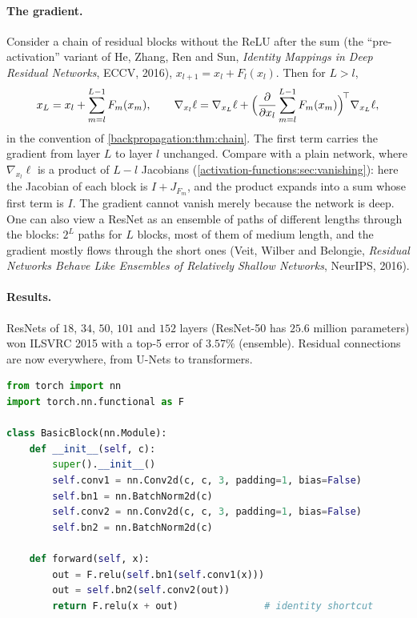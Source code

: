 \begin{notechapter}
\paragraph{The gradient.} Consider a chain of residual blocks without the ReLU after the sum
(the ``pre-activation'' variant of He, Zhang, Ren and Sun, \emph{Identity Mappings in Deep
Residual Networks}, ECCV, 2016), $x_{l+1} = x_l + F_l(x_l)$. Then for $L>l$,
\[
  x_L = x_l + \sum_{m=l}^{L-1}F_m(x_m),\qquad
  \nabla_{x_l}\ell = \nabla_{x_L}\ell + \Bigl(\frac{\partial}{\partial x_l}\sum_{m=l}^{L-1}F_m(x_m)\Bigr)^{\!\top}\nabla_{x_L}\ell,
\]
in the convention of \cref{backpropagation:thm:chain}. The first term carries the gradient
from layer $L$ to layer $l$ unchanged. Compare with a plain network, where $\nabla_{x_l}\ell$ is a product
of $L - l$ Jacobians (\cref{activation-functions:sec:vanishing}): here the Jacobian of each block
is $I + J_{F_m}$, and the product expands into a sum whose first term is $I$. The gradient cannot
vanish merely because the network is deep. One can also view a ResNet as an ensemble
of paths of different lengths through the blocks: $2^{L}$ paths for $L$ blocks, most of them of
medium length, and the gradient mostly flows through the short ones (Veit, Wilber and
Belongie, \emph{Residual Networks Behave Like Ensembles of Relatively Shallow Networks},
NeurIPS, 2016).

\paragraph{Results.} ResNets of $18$, $34$, $50$, $101$ and $152$ layers (ResNet-50 has $25.6$ million
parameters) won ILSVRC 2015 with a top-5 error of $3.57\%$ (ensemble). Residual
connections are now everywhere, from U-Nets to transformers.

\begin{lstlisting}[language=Python]
from torch import nn
import torch.nn.functional as F

class BasicBlock(nn.Module):
    def __init__(self, c):
        super().__init__()
        self.conv1 = nn.Conv2d(c, c, 3, padding=1, bias=False)
        self.bn1 = nn.BatchNorm2d(c)
        self.conv2 = nn.Conv2d(c, c, 3, padding=1, bias=False)
        self.bn2 = nn.BatchNorm2d(c)

    def forward(self, x):
        out = F.relu(self.bn1(self.conv1(x)))
        out = self.bn2(self.conv2(out))
        return F.relu(x + out)               # identity shortcut
\end{lstlisting}


\end{notechapter}
